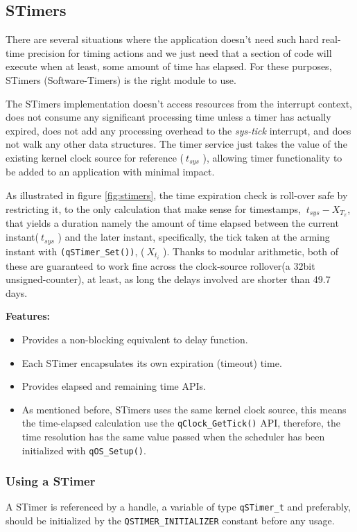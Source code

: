 \subsection{STimers}
There are several situations where the application doesn't need such hard real-time precision for timing actions and we just need that a section of code will execute when at least, some amount of time has elapsed. For these purposes, STimers (Software-Timers) is the right module to use. 

The STimers implementation doesn't access resources from the interrupt context, does not consume any significant processing time unless a timer has actually expired, does not add any processing overhead to the \textit{sys-tick} interrupt, and does not walk any other data structures. The timer service just takes the value of the existing kernel clock source for reference ($\ t_{sys}$ ), allowing timer functionality to be added to an application with minimal impact.



As illustrated in figure \ref{fig:stimers}, the time expiration check is roll-over safe by restricting it, to the only calculation that make sense for timestamps, $\ t_{sys} - X_{T_x}$, that yields a duration namely the amount of time elapsed between the current instant($\ t_{sys}$ ) and the later instant, specifically, the tick taken at the arming instant with \lstinline{(qSTimer_Set())}, ($\ X_{t_i}$ ).
Thanks to modular arithmetic, both of these are guaranteed to work fine across the clock-source rollover(a 32bit unsigned-counter), at least, as long the delays involved are shorter than 49.7 days. 
\medskip

\textbf{Features:}
\begin{itemize}
    \item Provides a non-blocking equivalent to delay function.
    \item Each STimer encapsulates its own expiration (timeout) time.
    \item Provides elapsed and remaining time APIs.
    \item As mentioned before, STimers uses the same kernel clock source, this means the time-elapsed calculation use the \lstinline{qClock_GetTick()} API, therefore, the time resolution has the same value passed when the scheduler has been initialized with \lstinline{qOS_Setup()}.
\end{itemize}

\subsubsection{Using a STimer}
A STimer is referenced by a handle, a variable of type \lstinline{qSTimer_t}  and preferably, should be initialized by the \lstinline{QSTIMER_INITIALIZER} constant before any usage. 


